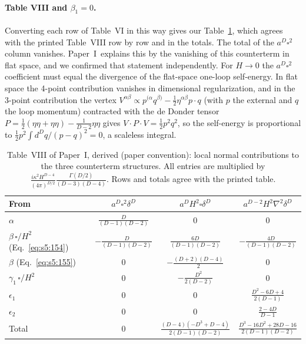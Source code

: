 \documentclass[aps,prd,onecolumn,10pt,nofootinbib,floatfix]{revtex4-2}
\newcommand{\PI}{Paper~I}
\begin{document}
\paragraph*{Table VIII and $\beta_1=0$.}
Converting each row of Table~VI in this way gives our Table~\ref{tab:s5:T8}, which agrees with the printed Table~VIII row by row and in the totals.
The total of the $a^D\square^2$ column vanishes.
\PI\ explains this by the vanishing of this counterterm in flat space, and we confirmed that statement independently.
For $H\to0$ the $a^D\square^2$ coefficient must equal the divergence of the flat-space one-loop self-energy.
In flat space the 4-point contribution vanishes in dimensional regularization, and in the 3-point contribution the vertex $V^{\alpha\beta}\propto p^{(\alpha}q^{\beta)}-\frac12\eta^{\alpha\beta}p\cdot q$ (with $p$ the external and $q$ the loop momentum) contracted with the de Donder tensor $P=\frac12(\eta\eta+\eta\eta)-\frac1{D-2}\eta\eta$ gives
$V\!\cdot\!P\!\cdot\!V=\frac12p^2q^2$, so the self-energy is proportional to $\frac12p^2\int d^Dq/(p-q)^2=0$, a scaleless integral.

\begin{table}[tb]
\caption{Table~VIII of \PI, derived (paper convention): local normal contributions to the three counterterm structures. All entries are multiplied by $\frac{i\kappa^2H^{D-4}}{(4\pi)^{D/2}}\frac{\Gamma(D/2)}{(D-3)(D-4)}$. Rows and totals agree with the printed table.}
\label{tab:s5:T8}
\renewcommand{\arraystretch}{1.5}
\begin{ruledtabular}
\begin{tabular}{lccc}
From & $a^D\square^2\delta^D$ & $a^DH^2\square\delta^D$ & $a^{D-2}H^2\nabla^2\delta^D$\\
\hline
$\alpha$ & $\frac{D}{(D-1)(D-2)}$ & $0$ & $0$\\
$\beta\,\square/H^2$ (Eq.~\eqref{eq:s5:154}) & $-\frac{D}{(D-1)(D-2)}$ & $\frac{6D}{(D-1)(D-2)}$ & $-\frac{4D}{(D-1)(D-2)}$\\
$\beta$ (Eq.~\eqref{eq:s5:155}) & $0$ & $-\frac{(D+2)(D-4)}{2}$ & $0$\\
$\gamma_1\,\square/H^2$ & $0$ & $-\frac{D^2}{2(D-2)}$ & $0$\\
$\epsilon_1$ & $0$ & $0$ & $\frac{D^2-6D+4}{2(D-1)}$\\
$\epsilon_2$ & $0$ & $0$ & $\frac{2-4D}{D-1}$\\
\hline
Total & $0$ & $\frac{(D-4)(-D^3+D-4)}{2(D-1)(D-2)}$ & $\frac{D^3-16D^2+28D-16}{2(D-1)(D-2)}$\\
\end{tabular}
\end{ruledtabular}
\end{table}
\end{document}
